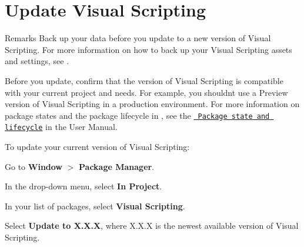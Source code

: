 \chapter{Update Visual Scripting}
\hypertarget{md__hey_tea_9_2_library_2_package_cache_2com_8unity_8visualscripting_0d1_88_80_2_documentation_0i_2vs-update}{}\label{md__hey_tea_9_2_library_2_package_cache_2com_8unity_8visualscripting_0d1_88_80_2_documentation_0i_2vs-update}
\label{md__hey_tea_9_2_library_2_package_cache_2com_8unity_8visualscripting_0d1_88_80_2_documentation_0i_2vs-update_autotoc_md5616}%
%
 \begin{DoxyRemark}{Remarks}
Back up your data before you update to a new version of Visual Scripting. For more information on how to back up your Visual Scripting assets and settings, see .
\end{DoxyRemark}
Before you update, confirm that the version of Visual Scripting is compatible with your current project and needs. For example, you shouldn\textquotesingle{}t use a Preview version of Visual Scripting in a production environment. For more information on package states and the package lifecycle in , see the \href{https://docs.unity3d.com/Manual/upm-lifecycle.html}{\texttt{ Package state and lifecycle}} in the  User Manual.

To update your current version of Visual Scripting\+:


\begin{DoxyEnumerate}
\item Go to {\bfseries{Window}} \texorpdfstring{$>$}{>} {\bfseries{Package Manager}}.
\item In the {\bfseries{}} drop-\/down menu, select {\bfseries{In Project}}.
\item In your list of packages, select {\bfseries{Visual Scripting}}.
\item Select {\bfseries{Update to {\ttfamily X.\+X.\+X}}}, where {\ttfamily X.\+X.\+X} is the newest available version of Visual Scripting. 
\end{DoxyEnumerate}